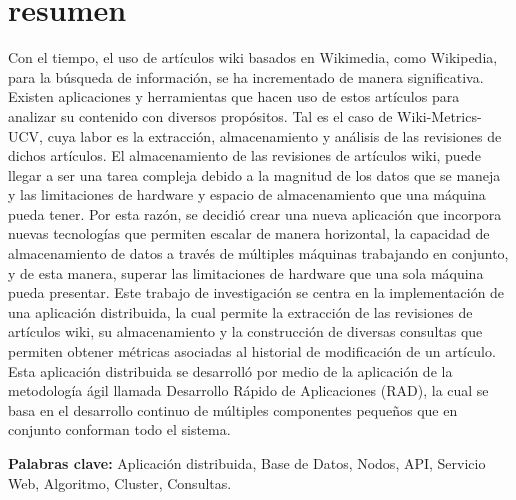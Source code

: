 \section*{resumen}

Con el tiempo, el uso de artículos wiki basados en Wikimedia,
como Wikipedia, para la búsqueda de información, se ha incrementado de
manera significativa.
Existen aplicaciones y herramientas que hacen uso de estos artículos
para analizar su contenido con diversos propósitos.
Tal es el caso de Wiki-Metrics-UCV, cuya labor es la extracción,
almacenamiento y análisis de las revisiones de dichos artículos.
El almacenamiento de las revisiones de artículos wiki,
puede llegar a ser una tarea compleja debido a la magnitud de los datos que se maneja y las limitaciones de hardware y espacio de almacenamiento que una máquina pueda tener.
Por esta razón, se decidió crear una nueva aplicación que incorpora
nuevas tecnologías que permiten escalar de manera horizontal, la capacidad
de almacenamiento de datos a través de múltiples máquinas trabajando en conjunto, y de esta manera,
superar las limitaciones de hardware que una sola máquina pueda presentar.
Este trabajo de investigación se centra en la implementación de una aplicación distribuida,
la cual permite la extracción de las revisiones de artículos wiki, su almacenamiento y la
construcción de diversas consultas que permiten obtener métricas asociadas al historial
de modificación de un artículo.
Esta aplicación distribuida se desarrolló por medio de la aplicación de la metodología
ágil llamada Desarrollo Rápido de Aplicaciones (RAD), la cual se basa en el desarrollo
continuo de múltiples componentes pequeños que en conjunto conforman todo el sistema.

\textbf{Palabras clave:} Aplicación distribuida, Base de Datos, Nodos, API, Servicio Web, Algoritmo, Cluster, Consultas.
